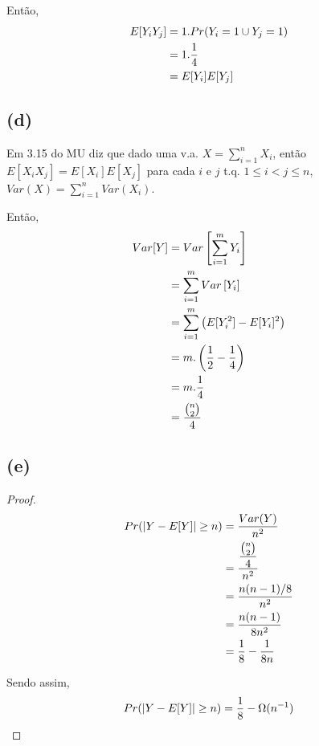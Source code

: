 \documentclass{article}
\begin{document}
Então, 
\begin{equation}
	\notag
	\begin{split}
		E[Y_iY_j] &= 1. Pr(Y_i = 1 \cup Y_j = 1)\\
		&= 1.\dfrac{1}{4}\\
		&= E[Y_i]E[Y_j]
	\end{split}
\end{equation}

\subsection*{(d)}
Em 3.15 do MU diz que dado uma v.a. $X = \sum\limits_{i=1}^n X_i$, então
$E[X_iX_j] = E[X_i]E[X_j]$ para cada $i$ e $j$ t.q. $1 \leq i < j \leq n$,
$Var(X) = \sum\limits_{i=1}^nVar(X_i)$.

Então, 
\begin{equation}
	\notag
	\begin{split}
		Var[Y] &= Var\left[\sum\limits_{i=1}^{m}Y_i \right]\\
		&= \sum\limits_{i=1}^{m}Var\left[Y_i \right]\\
		&= \sum\limits_{i=1}^{m}\left(E[Y_i^2] - E[Y_i]^2 \right)\\
		&= m. \left(\dfrac{1}{2} - \dfrac{1}{4} \right)\\
		&= m . \dfrac{1}{4}\\
		&= \dfrac{{n \choose 2}}{4}
	\end{split}
\end{equation}

\subsection*{(e)}
\begin{proof}
	\begin{equation}
		\notag
		\begin{split}
			Pr(|Y - E[Y]| \geq n) &= \dfrac{Var(Y)}{n^2}\\
			&= \dfrac{\dfrac{{n \choose 2}}{4}}{n^2}\\
			&= \dfrac{n(n-1)/8}{n^2}\\
			&= \dfrac{n(n-1)}{8n^2}\\
			&= \dfrac{1}{8} - \dfrac{1}{8n}
		\end{split}
	\end{equation}

	Sendo assim, 
	\begin{equation}
		\notag
		Pr(|Y - E[Y]| \geq n) = \dfrac{1}{8} - \Omega(n^{-1})
	\end{equation}
\end{proof}
\end{document}
